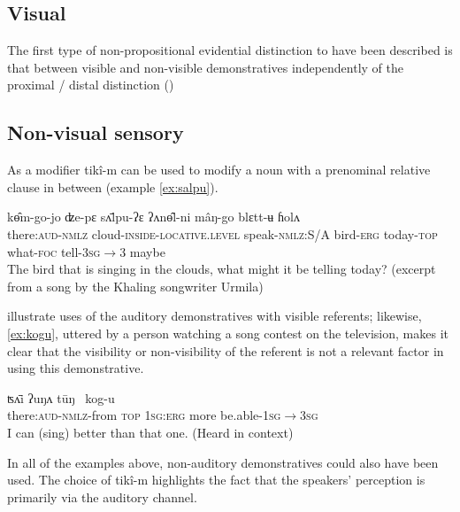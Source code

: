 \documentclass[oneside,a4paper,11pt]{article}
\newcommand{\ipa}[1]{{\phon \mbox{#1}}} %
\begin{document}
\subsection{Visual}
The first type of non-propositional evidential distinction to have been described  is that between visible and non-visible demonstratives independently of the proximal / distal distinction (\citealt[527-531]{boas11kwakiutl})


\citet{bach06deixis.wakashan}

\subsection{Non-visual sensory}
As a modifier \ipa{tikî-m} can be used to modify   a noun with a prenominal     relative clause  in between (example \ref{ex:salpu}).

\begin{exe}
\ex \label{ex:salpu}
\gll    	 	\ipa{tikî-m}   	\ipa{kɵ̂m-go-jo}   	\ipa{ʣe-pɛ}   	\ipa{sʌ̄lpu-ʔɛ}   	\ipa{ʔʌnɵ̂l-ni}   	\ipa{mâŋ-go}   	\ipa{blɛtt-ʉ}   	\ipa{ɦolʌ}   
 \\
 there:\textsc{aud}-\textsc{nmlz} cloud-\textsc{inside-locative.level} speak-\textsc{nmlz:}S/A bird-\textsc{erg} today-\textsc{top} what-\textsc{foc} tell-\textsc{3sg$\rightarrow$3} maybe \\
\glt The bird that is singing in the clouds, what might it be telling today? (excerpt from a song by the Khaling songwriter Urmila)
\end{exe}
 

 
  illustrate uses of the auditory demonstratives with visible referents; likewise,   \ref{ex:kogu}, uttered by a person watching a song contest on the television, makes it clear that the visibility or non-visibility of the referent is not a relevant factor in using this demonstrative.

\begin{exe}
\ex \label{ex:kogu}
\gll  	\ipa{tikî-m-kʌ}   	\ipa{ʦʌ̄i} \ipa{ʔuŋʌ} \ipa{tūŋ }   	\ipa{kog-u}   \\
there:\textsc{aud}-\textsc{nmlz}-from \textsc{top} \textsc{1sg:erg} more be.able-\textsc{1sg$\rightarrow$3sg}	  \\
\glt I can (sing) better than that one. (Heard in context)
\end{exe}

 

In all of the examples above, non-auditory demonstratives could also have been used. The choice of \ipa{tikî-m}  highlights the  fact that the  speakers' perception is primarily via the auditory channel.
 
\end{document}
